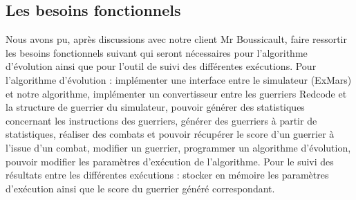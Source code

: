 \documentclass[french]{article}
\begin{document}
    \subsection{Les besoins fonctionnels}
        Nous avons pu, après discussions avec notre client Mr Boussicault, faire ressortir les besoins fonctionnels suivant qui seront nécessaires pour l’algorithme d’évolution ainsi que pour l’outil de suivi des différentes exécutions. Pour l'algorithme d'évolution : implémenter une interface entre le simulateur (ExMars) et notre algorithme, implémenter un convertisseur entre les guerriers Redcode et la structure de guerrier du simulateur, pouvoir générer des statistiques concernant les instructions des guerriers, générer des guerriers à partir de statistiques, réaliser des combats et pouvoir récupérer le score d’un guerrier à l’issue d’un combat, modifier un guerrier, programmer un algorithme d’évolution, pouvoir modifier les paramètres d’exécution de l’algorithme. Pour le suivi des résultats entre les différentes exécutions : stocker en mémoire les paramètres d’exécution ainsi que le score du guerrier généré correspondant.\\
\end{document}
